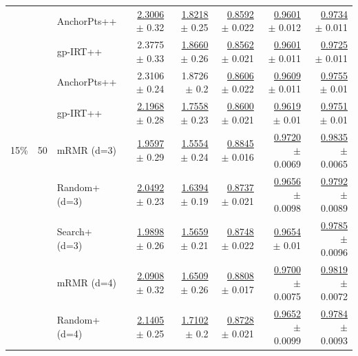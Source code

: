 \begin{longtable}{llp{}rrrrr}
 &  & AnchorPts++ & \underline{2.3006} {\scriptsize $\pm$ 0.32} & \underline{1.8218} {\scriptsize $\pm$ 0.25} & \underline{0.8592} {\scriptsize $\pm$ 0.022} & \underline{0.9601} {\scriptsize $\pm$ 0.012} & \underline{0.9734} {\scriptsize $\pm$ 0.011} \\
 &  & gp-IRT++ & 2.3775 {\scriptsize $\pm$ 0.33} & \underline{1.8660} {\scriptsize $\pm$ 0.26} & \underline{0.8562} {\scriptsize $\pm$ 0.021} & \underline{0.9601} {\scriptsize $\pm$ 0.011} & \underline{0.9725} {\scriptsize $\pm$ 0.011} \\
 &  & AnchorPts++ & 2.3106 {\scriptsize $\pm$ 0.24} & 1.8726 {\scriptsize $\pm$ 0.2} & \underline{0.8606} {\scriptsize $\pm$ 0.022} & \underline{0.9609} {\scriptsize $\pm$ 0.011} & \underline{0.9755} {\scriptsize $\pm$ 0.01} \\
 &  & gp-IRT++ & \underline{2.1968} {\scriptsize $\pm$ 0.28} & \underline{1.7558} {\scriptsize $\pm$ 0.23} & \underline{0.8600} {\scriptsize $\pm$ 0.021} & \underline{0.9619} {\scriptsize $\pm$ 0.01} & \underline{0.9751} {\scriptsize $\pm$ 0.01} \\
\midrule
15\% & 50 & mRMR (d=3) & \underline{1.9597} {\scriptsize $\pm$ 0.29} & \underline{1.5554} {\scriptsize $\pm$ 0.24} & \underline{0.8845} {\scriptsize $\pm$ 0.016} & \underline{0.9720} {\scriptsize $\pm$ 0.0069} & \underline{0.9835} {\scriptsize $\pm$ 0.0065} \\
 &  & Random+ (d=3) & \underline{2.0492} {\scriptsize $\pm$ 0.23} & \underline{1.6394} {\scriptsize $\pm$ 0.19} & \underline{0.8737} {\scriptsize $\pm$ 0.021} & \underline{0.9656} {\scriptsize $\pm$ 0.0098} & \underline{0.9792} {\scriptsize $\pm$ 0.0089} \\
 &  & Search+ (d=3) & \underline{1.9898} {\scriptsize $\pm$ 0.26} & \underline{1.5659} {\scriptsize $\pm$ 0.21} & \underline{0.8748} {\scriptsize $\pm$ 0.022} & \underline{0.9654} {\scriptsize $\pm$ 0.01} & \underline{0.9785} {\scriptsize $\pm$ 0.0096} \\
 &  & mRMR (d=4) & \underline{2.0908} {\scriptsize $\pm$ 0.32} & \underline{1.6509} {\scriptsize $\pm$ 0.26} & \underline{0.8808} {\scriptsize $\pm$ 0.017} & \underline{0.9700} {\scriptsize $\pm$ 0.0075} & \underline{0.9819} {\scriptsize $\pm$ 0.0072} \\
 &  & Random+ (d=4) & \underline{2.1405} {\scriptsize $\pm$ 0.25} & \underline{1.7102} {\scriptsize $\pm$ 0.2} & \underline{0.8728} {\scriptsize $\pm$ 0.021} & \underline{0.9652} {\scriptsize $\pm$ 0.0099} & \underline{0.9784} {\scriptsize $\pm$ 0.0093} \\

\end{longtable}

